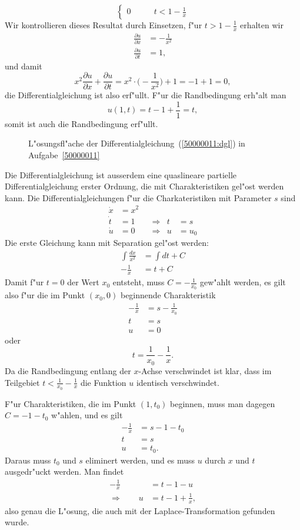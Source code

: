 \begin{loesung}
\[\begin{cases}
0
&\qquad t < 1-\frac1x
\end{cases}
\]
Wir kontrollieren dieses Resultat durch Einsetzen, f"ur $t>1-\frac1x$
erhalten wir
\begin{align*}
\frac{\partial u}{\partial x}
&=-\frac1{x^2}
\\
\frac{\partial u}{\partial t}
&=1,
\end{align*}
und damit
\[
x^2\frac{\partial u}{\partial x}+\frac{\partial u}{\partial t}
=
x^2\cdot \biggl(-\frac1{x^2}\biggr) + 1 = -1 + 1=0,
\]
die Differentialgleichung ist also erf"ullt.
F"ur die Randbedingung erh"alt man
\[
u(1,t)=t-1+\frac11=t,
\]
somit ist auch die Randbedingung erf"ullt.
\begin{figure}
\centering
{}
\caption{L"osungsfl"ache der Differentialgleichung~(\ref{50000011:dgl})
in Aufgabe~\ref{50000011}
\label{50000011:graph}}
\end{figure}
\end{loesung}

\begin{diskussion}
Die Differentialgleichung ist ausserdem eine quaslineare partielle
Differentialgleichung erster Ordnung, die mit Charakteristiken gel"ost
werden kann.
Die Differentialgleichungen f"ur die Charkateristiken mit Parameter $s$
sind 
\[
\begin{aligned}
\dot x&=x^2 &&       &   &     \\
\dot t&=1   &&\Rightarrow& t &= s  \\
\dot u&=0   &&\Rightarrow& u &= u_0
\end{aligned}
\]
Die erste Gleichung kann mit Separation gel"ost werden:
\begin{align*}
\int \frac{dx}{x^2}
&=
\int dt+C
\\
-\frac1x
&=
t+C
\end{align*}
Damit f"ur $t=0$ der Wert $x_0$ entsteht, muss $C=-\frac1{x_0}$
gew"ahlt werden, es gilt also f"ur die im Punkt $(x_0,0)$ beginnende
Charakteristik 
\begin{align*}
-\frac1x&=s-\frac1{x_0}\\
       t&=s\\
       u&=0
\end{align*}
oder
\[
t= \frac1{x_0} - \frac1x.
\]
Da die Randbedingung entlang der $x$-Achse verschwindet ist
klar, dass im Teilgebiet $t<\frac1{x_0}-\frac1x$
die Funktion $u$ identisch verschwindet.

F"ur Charakteristiken, die im Punkt $(1,t_0)$ beginnen, muss man dagegen
$C=-1-t_0$ w"ahlen, und es gilt
\begin{align*}
-\frac1x&=s-1-t_0\\
       t&=s      \\
       u&=t_0.
\end{align*}
Daraus muss $t_0$ und $s$ eliminert werden, und es muss $u$ durch $x$ und $t$
ausgedr"uckt werden.
Man findet
\begin{align*}
-\frac1x&=t-1-u
\\
\Rightarrow\qquad
u&=t-1+\frac1x,
\end{align*}
also genau die L"osung, die auch mit der Laplace-Transformation gefunden wurde.
\end{diskussion}

